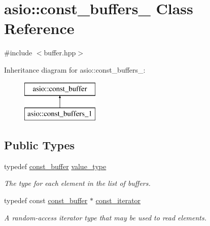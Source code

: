 \hypertarget{classasio_1_1const__buffers__1}{}\section{asio\+:\+:const\+\_\+buffers\+\_ Class Reference}
\label{classasio_1_1const__buffers__1}


{\ttfamily \#include $<$buffer.\+hpp$>$}

Inheritance diagram for asio\+:\+:const\+\_\+buffers\+\_\+:\begin{figure}[H]
\begin{center}
\leavevmode
\includegraphics[height=2.000000cm]{classasio_1_1const__buffers__1}
\end{center}
\end{figure}
\subsection*{Public Types}
\begin{DoxyCompactItemize}
\item 
typedef \hyperlink{classasio_1_1const__buffer}{const\+\_\+buffer} \hyperlink{classasio_1_1const__buffers__1_a6ff152a78d4d0e448b3b98e26dc22fc2}{value\+\_\+type}
\begin{DoxyCompactList}\small\item\em The type for each element in the list of buffers. \end{DoxyCompactList}\item 
typedef const \hyperlink{classasio_1_1const__buffer}{const\+\_\+buffer} $\ast$ \hyperlink{classasio_1_1const__buffers__1_af82877a0ca877a65af2e4c0990c854b4}{const\+\_\+iterator}
\begin{DoxyCompactList}\small\item\em A random-\/access iterator type that may be used to read elements. \end{DoxyCompactList}\end{DoxyCompactItemize}
